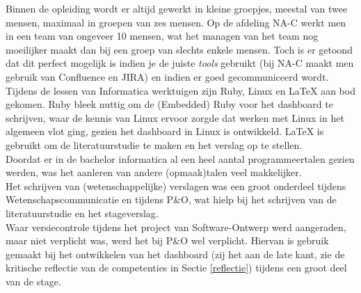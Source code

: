 \documentclass[10pt,a4paper]{article}
\begin{document}
Binnen de opleiding wordt er altijd gewerkt in kleine groepjes, meestal van twee mensen, maximaal in groepen van zes mensen. Op de afdeling NA-C werkt men in een team van ongeveer 10 mensen, wat het managen van het team nog moeilijker maakt dan bij een groep van slechts enkele mensen. Toch is er getoond dat dit perfect mogelijk is indien je de juiste \textit{tools} gebruikt (bij NA-C maakt men gebruik van Confluence en JIRA) en indien er goed gecommuniceerd wordt.\\
Tijdens de lessen van Informatica werktuigen zijn Ruby, Linux en LaTeX aan bod gekomen. Ruby bleek nuttig om de (Embedded) Ruby voor het dashboard te schrijven, waar de kennis van Linux ervoor zorgde dat werken met Linux in het algemeen vlot ging, gezien het dashboard in Linux is ontwikkeld. LaTeX is gebruikt om de literatuurstudie te maken en het verslag op te stellen.\\
Doordat er in de bachelor informatica al een heel aantal programmeertalen gezien werden, was het aanleren van andere (opmaak)talen veel makkelijker. \\
Het schrijven van (wetenschappelijke) verslagen was een groot onderdeel tijdens Wetenschapscommunicatie en tijdens P\&O, wat hielp bij het schrijven van de literatuurstudie en het stageverslag.\\
Waar versiecontrole tijdens het project van Software-Ontwerp werd aangeraden, maar niet verplicht was, werd het bij P\&O wel verplicht. Hiervan is gebruik gemaakt bij het ontwikkelen van het dashboard (zij het aan de late kant, zie de kritische reflectie van de competenties in Sectie \ref{reflectie}) tijdens een groot deel van de stage. 
\end{document}
